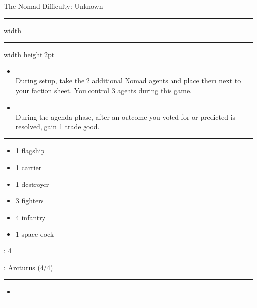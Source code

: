 {\handel\Huge The Nomad} \hfill {\Large Difficulty: Unknown} \vspace{-4pt}\\
\hrule width \hsize \kern 1mm \hrule width \hsize height 2pt


\begin{multicols}{2}


\begin{itemize}
\item {}\\
During setup, take the 2 additional Nomad agents and place them next to your faction sheet. You control 3 agents during this game.
\item {}\\
During the agenda phase, after an outcome you voted for or predicted is resolved, gain 1 trade good.
\end{itemize}


\vspace{-10pt}\rule{\hsize}{0.4pt}\vspace{5pt}


\vspace{-5pt}
\begin{multicols}{2}
\begin{itemize}
\item 1 flagship
\item 1 carrier
\item 1 destroyer
\item 3 fighters
\item 4 infantry
\item 1 space dock
\end{itemize}
\end{multicols}

\vspace{-5pt}
: 4

\vspace{2pt}
: Arcturus (4/4)

\rule{\hsize}{0.4pt}\vspace{5pt}


\begin{itemize}
\item \sling
\end{itemize}

\vspace{-10pt}\rule{\hsize}{0.4pt}\vspace{5pt}


\end{multicols}
